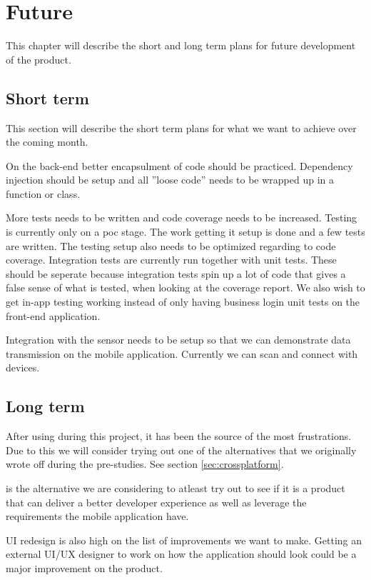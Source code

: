 \chapter{Future}
This chapter will describe the short and long term plans for future development of the product.

\section{Short term}
This section will describe the short term plans for what we want to achieve over the coming month.

On the back-end better encapsulment of code should be practiced.
Dependency injection should be setup and all ''loose code'' needs to be wrapped up in a function or class.

More tests needs to be written and code coverage needs to be increased.
Testing is currently only on a \gls{poc} stage. The work getting it setup is done and a few tests are written.
The testing setup also needs to be optimized regarding to code coverage.
Integration tests are currently run together with unit tests. 
These should be seperate because integration tests spin up a lot of code that gives a false sense of what is tested, when looking at the coverage report.
We also wish to get in-app testing working instead of only having business login unit tests on the front-end application.

Integration with the  sensor needs to be setup so that we can demonstrate  data transmission on the mobile application.
Currently we can scan and connect with  devices.

\section{Long term}
After using  during this project, it has been the source of the most frustrations. 
Due to this we will consider trying out one of the alternatives that we originally wrote off during the pre-studies. See section \ref{sec:crossplatform}. 

 is the alternative we are considering to atleast try out to see if it is a product that can deliver a better developer experience as well as leverage the requirements the mobile application have.

UI redesign is also high on the list of improvements we want to make.
Getting an external UI/UX designer to work on how the application should look could be a major improvement on the product.

